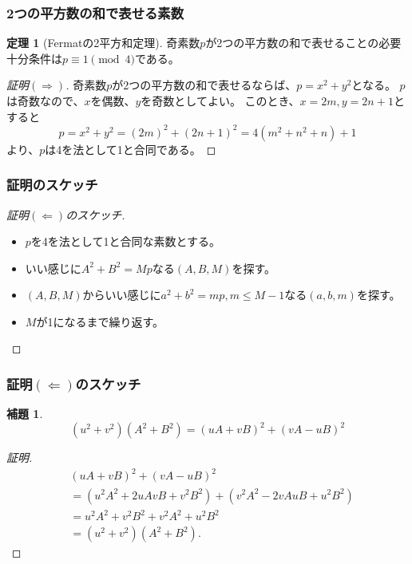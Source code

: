 \documentclass[dvipdfmx,11pt,notheorems]{beamer}
\theoremstyle{definition}
\newtheorem{theorem}{定理}
\newtheorem{lemma}{補題}
\begin{document}
\begin{frame}\frametitle{2つの平方数の和で表せる素数}

\begin{theorem}[Fermatの2平方和定理]
奇素数$p$が2つの平方数の和で表せることの必要十分条件は$p \equiv 1 \pmod{4}$である。
\end{theorem}

\begin{proof}[証明$(\Rightarrow)$]
奇素数$p$が2つの平方数の和で表せるならば、$p=x^{2}+y^{2}$となる。
$p$は奇数なので、$x$を偶数、$y$を奇数としてよい。
このとき、$x=2m, y=2n+1$とすると
\begin{equation*}
p = x^{2}+y^{2} = (2m)^{2} + (2n + 1)^{2} = 4(m^{2} + n^{2} + n) + 1
\end{equation*}
より、$p$は4を法として1と合同である。

\end{proof}

\end{frame}

\begin{frame}\frametitle{証明のスケッチ}

\begin{proof}[証明$(\Leftarrow)$のスケッチ]

\begin{itemize}
\item $p$を4を法として1と合同な素数とする。
\item いい感じに$A^{2}+B^{2} = Mp$なる$(A, B, M)$を探す。
\item $(A, B, M)$からいい感じに$a^{2}+b^{2}=mp, m \leq M-1$なる$(a, b, m)$を探す。
\item $M$が1になるまで繰り返す。
\end{itemize}

\end{proof}

\end{frame}

\begin{frame}\frametitle{証明$(\Leftarrow)$のスケッチ}

\begin{lemma}
\begin{equation*}
(u^{2} + v^{2})(A^{2}+B^{2}) = (uA+vB)^{2} + (vA-uB)^{2}
\end{equation*}
\end{lemma}

\begin{proof}[証明]

\begin{equation*} 
\begin{split}
&(uA+vB)^{2} + (vA-uB)^{2}  \\
&= (u^{2}A^{2} + 2uAvB + v^{2}B^{2}) + (v^{2}A^{2}-2vAuB + u^{2}B^{2})  \\
 &= u^{2}A^{2}+v^{2}B^{2} + v^{2}A^{2}+u^{2}B^{2} \\
 &= (u^{2} + v^{2})(A^{2}+B^{2}).
 \end{split}
\end{equation*}

\end{proof}

\end{frame}
\end{document}
